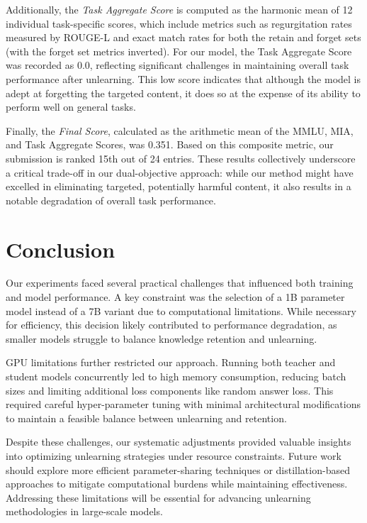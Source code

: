 \documentclass[11pt]{article}
\begin{document}
Additionally, the \textit{Task Aggregate Score} is computed as the harmonic mean of 12 individual task-specific scores, which include metrics such as regurgitation rates measured by ROUGE-L and exact match rates for both the retain and forget sets (with the forget set metrics inverted). For our model, the Task Aggregate Score was recorded as 0.0, reflecting significant challenges in maintaining overall task performance after unlearning. This low score indicates that although the model is adept at forgetting the targeted content, it does so at the expense of its ability to perform well on general tasks.

Finally, the \textit{Final Score}, calculated as the arithmetic mean of the MMLU, MIA, and Task Aggregate Scores, was 0.351. Based on this composite metric, our submission is ranked 15th out of 24 entries. These results collectively underscore a critical trade-off in our dual-objective approach: while our method might have excelled in eliminating targeted, potentially harmful content, it also results in a notable degradation of overall task performance.

\section{Conclusion}

Our experiments faced several practical challenges that influenced both training and model performance. A key constraint was the selection of a 1B parameter model instead of a 7B variant due to computational limitations. While necessary for efficiency, this decision likely contributed to performance degradation, as smaller models struggle to balance knowledge retention and unlearning.  

GPU limitations further restricted our approach. Running both teacher and student models concurrently led to high memory consumption, reducing batch sizes and limiting additional loss components like random answer loss. This required careful hyper-parameter tuning with minimal architectural modifications to maintain a feasible balance between unlearning and retention.   

Despite these challenges, our systematic adjustments provided valuable insights into optimizing unlearning strategies under resource constraints. Future work should explore more efficient parameter-sharing techniques or distillation-based approaches to mitigate computational burdens while maintaining effectiveness. Addressing these limitations will be essential for advancing unlearning methodologies in large-scale models.  
\end{document}
